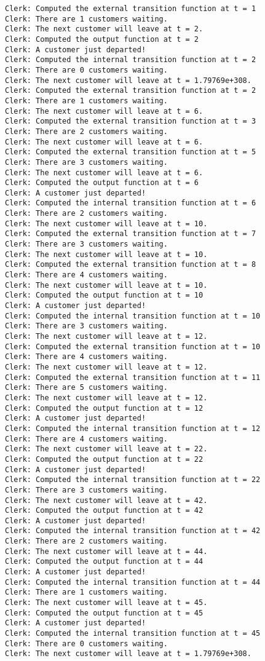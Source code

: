 \begin{verbatim}
Clerk: Computed the external transition function at t = 1
Clerk: There are 1 customers waiting.
Clerk: The next customer will leave at t = 2.
Clerk: Computed the output function at t = 2
Clerk: A customer just departed!
Clerk: Computed the internal transition function at t = 2
Clerk: There are 0 customers waiting.
Clerk: The next customer will leave at t = 1.79769e+308.
Clerk: Computed the external transition function at t = 2
Clerk: There are 1 customers waiting.
Clerk: The next customer will leave at t = 6.
Clerk: Computed the external transition function at t = 3
Clerk: There are 2 customers waiting.
Clerk: The next customer will leave at t = 6.
Clerk: Computed the external transition function at t = 5
Clerk: There are 3 customers waiting.
Clerk: The next customer will leave at t = 6.
Clerk: Computed the output function at t = 6
Clerk: A customer just departed!
Clerk: Computed the internal transition function at t = 6
Clerk: There are 2 customers waiting.
Clerk: The next customer will leave at t = 10.
Clerk: Computed the external transition function at t = 7
Clerk: There are 3 customers waiting.
Clerk: The next customer will leave at t = 10.
Clerk: Computed the external transition function at t = 8
Clerk: There are 4 customers waiting.
Clerk: The next customer will leave at t = 10.
Clerk: Computed the output function at t = 10
Clerk: A customer just departed!
Clerk: Computed the internal transition function at t = 10
Clerk: There are 3 customers waiting.
Clerk: The next customer will leave at t = 12.
Clerk: Computed the external transition function at t = 10
Clerk: There are 4 customers waiting.
Clerk: The next customer will leave at t = 12.
Clerk: Computed the external transition function at t = 11
Clerk: There are 5 customers waiting.
Clerk: The next customer will leave at t = 12.
Clerk: Computed the output function at t = 12
Clerk: A customer just departed!
Clerk: Computed the internal transition function at t = 12
Clerk: There are 4 customers waiting.
Clerk: The next customer will leave at t = 22.
Clerk: Computed the output function at t = 22
Clerk: A customer just departed!
Clerk: Computed the internal transition function at t = 22
Clerk: There are 3 customers waiting.
Clerk: The next customer will leave at t = 42.
Clerk: Computed the output function at t = 42
Clerk: A customer just departed!
Clerk: Computed the internal transition function at t = 42
Clerk: There are 2 customers waiting.
Clerk: The next customer will leave at t = 44.
Clerk: Computed the output function at t = 44
Clerk: A customer just departed!
Clerk: Computed the internal transition function at t = 44
Clerk: There are 1 customers waiting.
Clerk: The next customer will leave at t = 45.
Clerk: Computed the output function at t = 45
Clerk: A customer just departed!
Clerk: Computed the internal transition function at t = 45
Clerk: There are 0 customers waiting.
Clerk: The next customer will leave at t = 1.79769e+308.
\end{verbatim}

